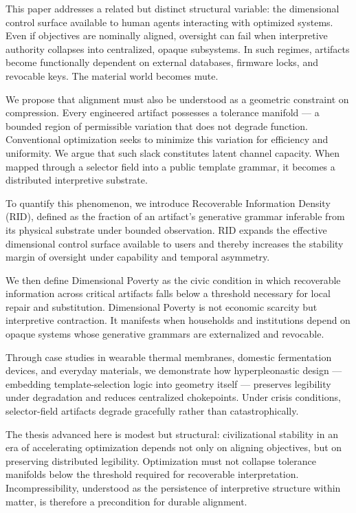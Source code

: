 \documentclass[11pt]{article}
\begin{document}
This paper addresses a related but distinct structural variable: the dimensional control surface available to human agents interacting with optimized systems. Even if objectives are nominally aligned, oversight can fail when interpretive authority collapses into centralized, opaque subsystems. In such regimes, artifacts become functionally dependent on external databases, firmware locks, and revocable keys. The material world becomes mute.

We propose that alignment must also be understood as a geometric constraint on compression. Every engineered artifact possesses a tolerance manifold — a bounded region of permissible variation that does not degrade function. Conventional optimization seeks to minimize this variation for efficiency and uniformity. We argue that such slack constitutes latent channel capacity. When mapped through a selector field into a public template grammar, it becomes a distributed interpretive substrate.

To quantify this phenomenon, we introduce Recoverable Information Density (RID), defined as the fraction of an artifact’s generative grammar inferable from its physical substrate under bounded observation. RID expands the effective dimensional control surface available to users and thereby increases the stability margin of oversight under capability and temporal asymmetry.

We then define Dimensional Poverty as the civic condition in which recoverable information across critical artifacts falls below a threshold necessary for local repair and substitution. Dimensional Poverty is not economic scarcity but interpretive contraction. It manifests when households and institutions depend on opaque systems whose generative grammars are externalized and revocable.

Through case studies in wearable thermal membranes, domestic fermentation devices, and everyday materials, we demonstrate how hyperpleonastic design — embedding template-selection logic into geometry itself — preserves legibility under degradation and reduces centralized chokepoints. Under crisis conditions, selector-field artifacts degrade gracefully rather than catastrophically.

The thesis advanced here is modest but structural: civilizational stability in an era of accelerating optimization depends not only on aligning objectives, but on preserving distributed legibility. Optimization must not collapse tolerance manifolds below the threshold required for recoverable interpretation. Incompressibility, understood as the persistence of interpretive structure within matter, is therefore a precondition for durable alignment.
\end{document}
